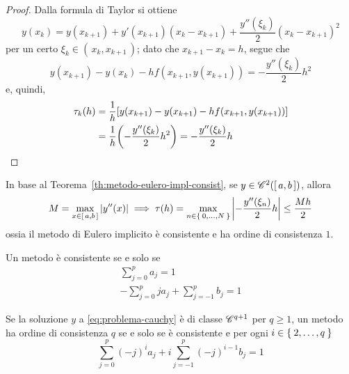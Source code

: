 	\begin{proof}
		Dalla formula di Taylor si ottiene
		\begin{equation*}
			y (x_k) = y (x_{k + 1}) + y' (x_{k + 1}) (x_k - x_{k + 1}) + \frac{y'' (\xi_k)}{2} (x_k - x_{k + 1})^2
		\end{equation*}
		per un certo \(\xi_k \in (\, x_k, x_{k + 1} \,)\); dato che \(x_{k + 1} - x_k = h\), segue che
		\begin{equation*}
			y (x_{k + 1}) - y (x_k) - h f (x_{k + 1}, y (x_{k + 1})) = - \frac{y'' (\xi_k)}{2} h^2
		\end{equation*}
		e, quindi,
		\begin{equation*}
			\begin{split}
				\tau_k (h) &= \frac{1}{h} \qty[y (x_{k + 1}) - y (x_{k + 1}) - h f (x_{k + 1}, y (x_{k + 1}))] \\
				&= \frac{1}{h} \qty(- \frac{y'' (\xi_k)}{2} h^2) = - \frac{y'' (\xi_k)}{2} h \qedhere
			\end{split}
		\end{equation*}
	\end{proof}

	\begin{osservazione}
		In base al Teorema~\ref{th:metodo-eulero-impl-consist}, se \(y \in \mathscr{C}^2 ([\, a, b \,])\), allora
		\begin{equation*}
			M = \max_{x \in [\, a, b \,]} \abs{y'' (x)} \implies \tau (h) = \max_{n \in \Set{0, \dots, N}} \abs{- \frac{y'' (\xi_n)}{2} h} \le \frac{M h}{2}
		\end{equation*}
		ossia il metodo di Eulero implicito è consistente e ha ordine di consistenza \(1\).
	\end{osservazione}

	\begin{teorema}\label{th:metodo-lm-consistenza}
		Un metodo  è consistente se e solo se
		\begin{subequations}\label{eq:metodo-lm-consistenza}
			\begin{gather}
				\sum_{j = 0}^p a_j = 1 \\
				- \sum_{j = 0}^p j a_j + \sum_{j = - 1}^p b_j = 1
			\end{gather}
		\end{subequations}
		
		Se la soluzione \(y\) a \eqref{eq:problema-cauchy} è di classe \(\mathscr{C}^{q + 1}\) per \(q \ge 1\), un metodo  ha ordine di consistenza \(q\) se e solo se è consistente e per ogni \(i \in \Set{2, \dots, q}\)
		\begin{equation}\label{eq:metodo-lm-consistenza-q}
			\sum_{j = 0}^p (-j)^i a_j + i \sum_{j = - 1}^p (-j)^{i - 1} b_j = 1
		\end{equation}
	\end{teorema}

